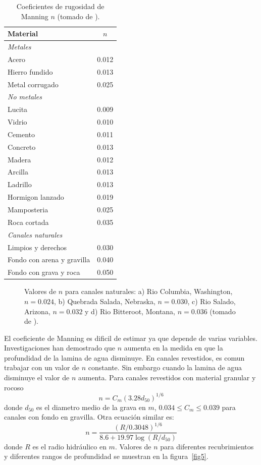 \documentclass[11pt, oneside]{article}
\begin{document}
\begin{table}[h!]
\centering
\begin{tabular}{l c}
 \hline
  Material & $n$ \\ [0.5ex]
 \hline\hline
 \emph{Metales} & \\
 Acero & 0.012 \\
 Hierro fundido & 0.013 \\
 Metal corrugado & 0.025 \\
 \emph{No metales} & \\
 Lucita & 0.009 \\
 Vidrio & 0.010 \\
 Cemento & 0.011 \\
 Concreto & 0.013 \\
 Madera & 0.012 \\
 Arcilla & 0.013 \\
 Ladrillo & 0.013 \\
 Hormigon lanzado & 0.019 \\
 Mamposteria & 0.025 \\
 Roca cortada & 0.035 \\
 \emph{Canales naturales} & \\
 Limpios y derechos & 0.030 \\
 Fondo con arena y gravilla & 0.040 \\
 Fondo con grava y roca & 0.050 \\
\hline
\end{tabular}
\caption{Coeficientes de rugosidad de Manning $n$ (tomado de \cite{VChow}).}
\label{ta1}
\end{table}

\begin{figure}[h]
\centering
\caption{Valores de $n$ para canales naturales: a) Rio Columbia, Washington, $n=0.024$, b) Quebrada Salada, Nebraska, $n=0.030$, c) Rio Salado, Arizona, $n=0.032$ y d) Rio Bitteroot, Montana, $n=0.036$  (tomado de \cite{Chau}).}
\label{fig4}
\end{figure}

El coeficiente de Manning es dificil de estimar ya que depende de varias variables. Investigaciones han demostrado que $n$ aumenta en la medida en que la profundidad de la lamina de agua disminuye. En canales revestidos, es comun trabajar con un valor de $n$ constante. Sin embargo cuando la lamina de agua disminuye el valor de $n$ aumenta. Para canales revestidos con material granular y rocoso 
$$
n=C_m \left( 3.28 d_{50} \right)^{1/6} 
$$
donde $d_{50}$ es el diametro medio de la grava en $m$, $0.034 \leq C_m \leq 0.039$ para canales con fondo en gravilla. Otra ecuaci\'on  similar es:
$$
n = \frac{\left( R/0.3048 \right)^{1/6}}{8.6 + 19.97 \log \left( R/d_{50} \right)} 
$$
donde $R$ es el radio hidr\'aulico en $m$. Valores de $n$ para diferentes recubrimientos y diferentes rangos de profundidad se muestran en la figura~\ref{fig5}.
\end{document}
